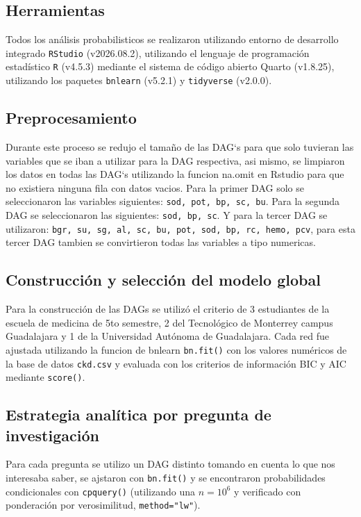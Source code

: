 \documentclass{Academic}
\begin{document}
\subsection{Herramientas}
Todos los análisis probabilisticos se realizaron utilizando entorno de desarrollo 
integrado \texttt{RStudio} (v2026.08.2), utilizando el lenguaje de programación 
estadístico \texttt{R} (v4.5.3) \cite{R} mediante el sistema de código abierto 
Quarto (v1.8.25), utilizando los paquetes \texttt{bnlearn} (v5.2.1)\cite{Bnlearn} 
y \texttt{tidyverse} (v2.0.0).

\subsection{Preprocesamiento}
Durante este proceso se redujo el tamaño de las DAG`s para que solo tuvieran las variables que se iban a utilizar para la DAG respectiva, asi mismo, se limpiaron los datos en todas las DAG`s utilizando la funcion na.omit en Rstudio para que no existiera ninguna fila con datos vacios. Para la primer DAG solo se seleccionaron las variables siguientes: \texttt{sod, pot, bp, sc, bu}. Para la segunda DAG se seleccionaron las siguientes: \texttt{sod, bp, sc}. Y para la tercer DAG se utilizaron: \texttt{bgr, su, sg, al, sc, bu, pot, sod, bp, rc, hemo, pcv}, para esta tercer DAG tambien se convirtieron todas las variables a tipo numericas.

\subsection{Construcción y selección del modelo global}
Para la construcción de las DAGs se utilizó el criterio de 3 estudiantes de la escuela de 
medicina de 5to semestre, 2 del Tecnológico de Monterrey campus Guadalajara y 1 de 
la Universidad Autónoma de Guadalajara. Cada red fue ajustada utilizando la funcion de 
bnlearn \texttt{bn.fit()} con los valores numéricos de la base de datos \texttt{ckd.csv}
y evaluada con los criterios de información BIC y AIC mediante \texttt{score()}.

\subsection{Estrategia analítica por pregunta de investigación}
Para cada pregunta se utilizo un DAG distinto tomando en cuenta lo que nos interesaba 
saber, se ajstaron con \texttt{bn.fit()} y se encontraron probabilidades condicionales 
con \texttt{cpquery()} (utilizando una \(n=10^{6}\) y verificado con ponderación por
verosimilitud, \texttt{method="lw"}).
\end{document}
